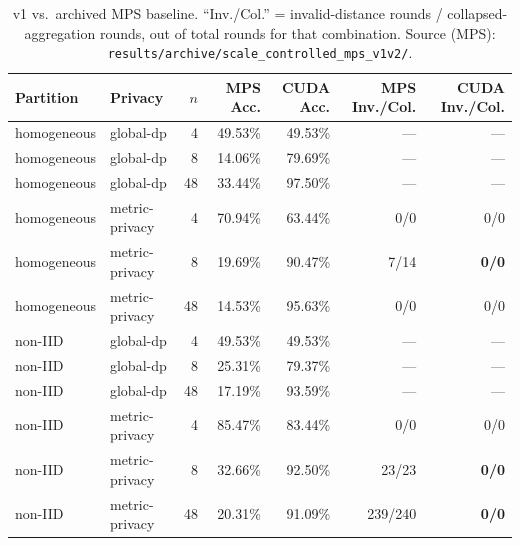 \documentclass[11pt]{article}
\newcommand{\code}[1]{\texttt{#1}}
\begin{document}
\begin{table}[h]
\centering
\footnotesize
\begin{tabular}{llrrrrr}
\toprule
Partition & Privacy & $n$ & MPS Acc. & CUDA Acc. & MPS Inv./Col. & CUDA Inv./Col. \\
\midrule
homogeneous & global-dp      & 4  & 49.53\% & 49.53\% & --- & --- \\
homogeneous & global-dp      & 8  & 14.06\% & 79.69\% & --- & --- \\
homogeneous & global-dp      & 48 & 33.44\% & 97.50\% & --- & --- \\
homogeneous & metric-privacy & 4  & 70.94\% & 63.44\% & 0/0   & 0/0 \\
homogeneous & metric-privacy & 8  & 19.69\% & 90.47\% & 7/14  & \textbf{0/0} \\
homogeneous & metric-privacy & 48 & 14.53\% & 95.63\% & 0/0   & 0/0 \\
non-IID     & global-dp      & 4  & 49.53\% & 49.53\% & --- & --- \\
non-IID     & global-dp      & 8  & 25.31\% & 79.37\% & --- & --- \\
non-IID     & global-dp      & 48 & 17.19\% & 93.59\% & --- & --- \\
non-IID     & metric-privacy & 4  & 85.47\% & 83.44\% & 0/0    & 0/0 \\
non-IID     & metric-privacy & 8  & 32.66\% & 92.50\% & 23/23  & \textbf{0/0} \\
non-IID     & metric-privacy & 48 & 20.31\% & 91.09\% & 239/240 & \textbf{0/0} \\
\bottomrule
\end{tabular}
\caption{v1 vs.\ archived MPS baseline. ``Inv./Col.'' = invalid-distance rounds / collapsed-aggregation
rounds, out of total rounds for that combination. Source (MPS): \code{results/archive/scale\_controlled\_mps\_v1v2/}.}
\label{tab:mpscomp-v1}
\end{table}
\end{document}
